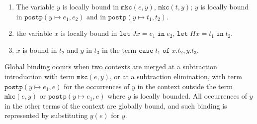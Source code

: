 \begin{definition}
\begin{enumerate}
\item The variable $y$ is locally bound in $\mathtt{mkc}(e,y)$, $\mathtt{mkc}(t,y)$; 
$y$ is locally bound in $\mathtt{postp}(y\mapsto e_1, e_2)$ and in $\mathtt{postp}(y\mapsto t_1, t_2)$.
\item the variable $x$ is locally bound in $\mathtt{let}\; Jx = e_1\; \mathtt{in}\; e_2$, $\mathtt{let}\; Hx = t_1\; \mathtt{in}\; t_2$.
\item $x$ is bound in $t_2$ and $y$ in $t_3$ in the term $\mathtt{case}\; t_1\; \mathtt{of}\; x.t_2, y.t_3$.
\end{enumerate}
\end{definition}
Global binding occurs when two contexts are merged at a subtraction introduction with term  $\mathtt{mkc}(e,y)$, or at a subtraction elimination, with term $\mathtt{postp}(y\mapsto e_1, e)$ for the occurrences of $y$ in the context outside the term $\mathtt{mkc}(e,y)$ or $\mathtt{postp}(y\mapsto e_1, e)$ where $y$ is locally bounded. All occurrences of $y$ in 
the other terms of the context are globally bound, and such binding is represented by substituting $y(e)$ for $y$. 
